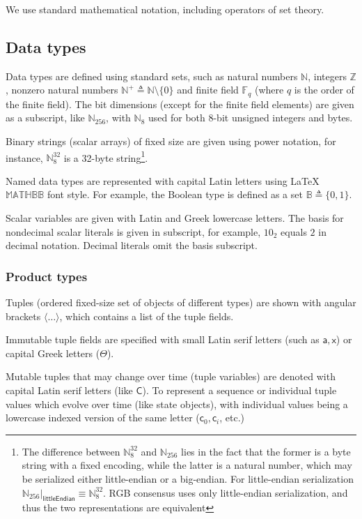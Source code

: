 \documentclass[9pt,oneside]{amsart}
\begin{document}
\begin{multicols}{2}
We use standard mathematical notation, including operators of set theory.

\subsection{Data types}

Data types are defined using standard sets, such as
natural numbers $\mathbb{N}$, integers $\mathbb{Z}$,
nonzero natural numbers $\mathbb{N}^+ \triangleq \mathbb{N}\setminus\{0\}$
and finite field $\mathbb{F}_q$ (where $q$ is the order of the finite field).
The bit dimensions (except for the finite field elements) are given as a subscript,
like $\mathbb{N}_{256}$, with $\mathbb{N}_8$ used for both 8-bit unsigned integers and bytes.

Binary strings (scalar arrays) of fixed size are given using power notation,
for instance, $\mathbb{N}_8^{32}$ is a 32-byte string\footnote{
The difference between $\mathbb{N}_8^{32}$ and $\mathbb{N}_{256}$ lies in the fact that
the former is a byte string with a fixed encoding,
while the latter is a natural number, which may be serialized either
little-endian or a big-endian.
For little-endian serialization $\mathbb{N}_{256}|_\mathsf{littleEndian} \equiv \mathbb{N}_8^{32}$.
RGB consensus uses only little-endian serialization,
and thus the two representations are equivalent}.

Named data types are represented with capital Latin letters using \LaTeX\ $\mathbb{MATHBB}$ font style.
For example, the Boolean type is defined as a set $\mathbb{B} \triangleq \{0, 1\}$.

Scalar variables are given with Latin and Greek lowercase letters.
The basis for nondecimal scalar literals is given in subscript,
for example, $10_2$ equals $2$ in decimal notation. Decimal literals omit the basis subscript.

\subsubsection{Product types}

Tuples (ordered fixed-size set of objects of different types)
are shown with angular brackets $\langle \ldots \rangle$,
which contains a list of the tuple fields.

Immutable tuple fields are specified with small Latin serif letters
(such as $\mathsf{a}, \mathsf{x}$) or capital Greek letters ($\Theta$).

Mutable tuples that may change over time (tuple variables) are denoted
with capital Latin serif letters (like $\mathsf{C}$). To represent
a sequence or individual tuple values which evolve over time (like state objects),
with individual values being a lowercase indexed version of the same letter
($\mathsf{c}_0, \mathsf{c}_i$, etc.)


\end{multicols}
\end{document}
